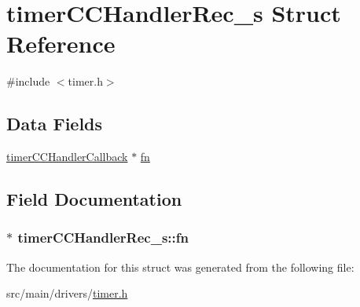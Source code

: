 \hypertarget{structtimerCCHandlerRec__s}{\section{timer\+C\+C\+Handler\+Rec\+\_\+s Struct Reference}
\label{structtimerCCHandlerRec__s}
}


{\ttfamily \#include $<$timer.\+h$>$}

\subsection*{Data Fields}
\begin{DoxyCompactItemize}
\item 
\hyperlink{timer_8h_a776b1723f0f72a5cc67e711338a7ff4f}{timer\+C\+C\+Handler\+Callback} $\ast$ \hyperlink{structtimerCCHandlerRec__s_add57a71c254eb6ae083b2d843c34bff2}{fn}
\end{DoxyCompactItemize}


\subsection{Field Documentation}
\hypertarget{structtimerCCHandlerRec__s_add57a71c254eb6ae083b2d843c34bff2}{
\subsubsection[{fn}]{$\ast$ timer\+C\+C\+Handler\+Rec\+\_\+s\+::fn}}\label{structtimerCCHandlerRec__s_add57a71c254eb6ae083b2d843c34bff2}


The documentation for this struct was generated from the following file\+:\begin{DoxyCompactItemize}
\item 
src/main/drivers/\hyperlink{timer_8h}{timer.\+h}\end{DoxyCompactItemize}
